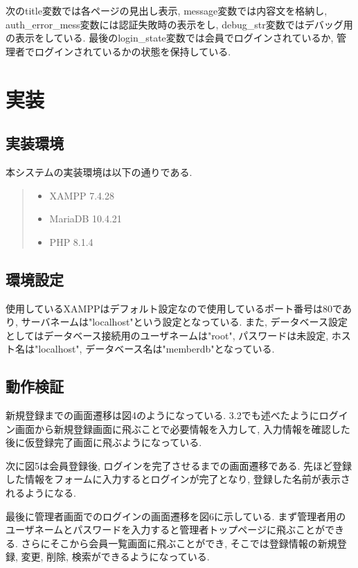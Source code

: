 \documentclass[submit,techrep]{ipsj}
\begin{document}
次のtitle変数では各ページの見出し表示, message変数では内容文を格納し, auth\_error\_mess変数には認証失敗時の表示をし, debug\_str変数ではデバッグ用の表示をしている. 最後のlogin\_state変数では会員でログインされているか, 管理者でログインされているかの状態を保持している. 

\section{実装}
\subsection{実装環境}
本システムの実装環境は以下の通りである. 

\begin{quote}
 \begin{itemize}
 \item XAMPP 7.4.28
 \item MariaDB 10.4.21
 \item PHP 8.1.4
 \end{itemize}
\end{quote}

\subsection{環境設定}
使用しているXAMPPはデフォルト設定なので使用しているポート番号は80であり, サーバネームは"localhost"という設定となっている. また, データベース設定としてはデータベース接続用のユーザネームは"root", パスワードは未設定, ホスト名は"localhost", データベース名は"memberdb"となっている. 

\subsection{動作検証}
新規登録までの画面遷移は図4のようになっている. 3.2でも述べたようにログイン画面から新規登録画面に飛ぶことで必要情報を入力して, 入力情報を確認した後に仮登録完了画面に飛ぶようになっている. 


次に図5は会員登録後, ログインを完了させるまでの画面遷移である. 先ほど登録した情報をフォームに入力するとログインが完了となり, 登録した名前が表示されるようになる.


最後に管理者画面でのログインの画面遷移を図6に示している. まず管理者用のユーザネームとパスワードを入力すると管理者トップページに飛ぶことができる. さらにそこから会員一覧画面に飛ぶことができ, そこでは登録情報の新規登録, 変更, 削除, 検索ができるようになっている. 
\end{document}
